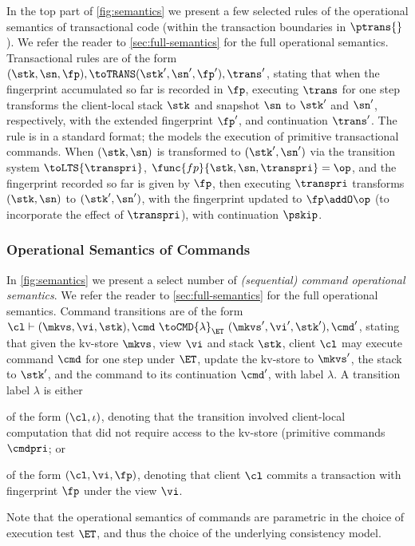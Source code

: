 In the top part of \cref{fig:semantics} we present a few selected rules of the operational semantics of transactional code (within the transaction boundaries in $\ptrans{}$). 
We refer the reader to \cref{sec:full-semantics} for the full operational semantics.
Transactional rules are of the form $(\stk, \sn, \fp), \toTRANS (\stk', \sn', \fp'), \trans'$, 
stating that when the fingerprint accumulated so far is recorded in $\fp$, 
executing $\trans$ for one step transforms the client-local stack $\stk$ 
and snapshot $\sn$ %
to $\stk'$ and $\sn'$, respectively, with the extended fingerprint $\fp'$, and continuation $\trans'$.
The  rule is in a standard format; 
the   models the execution of primitive transactional commands.
When $(\stk, \sn)$ is transformed to $(\stk', \sn')$ via the transition system $\toLTS{\transpri}$,
$\func{fp}{\stk, \sn, \transpri} = \op$, and the fingerprint recorded so far is given by $\fp$, 
then executing $\transpri$ transforms $(\stk, \sn)$ to $(\stk', \sn')$, with the fingerprint updated to $\fp \addO \op$ (to incorporate the effect of $\transpri$), with continuation $\pskip$. 

\subsubsection{Operational Semantics of Commands}
In \cref{fig:semantics} we present a select number of \emph{(sequential) command operational semantics}.
We refer the reader to \cref{sec:full-semantics} for the full operational semantics.
Command transitions are of the form $\cl \vdash (\mkvs, \vi, \stk), \cmd \ \toCMD{\lambda}_{\ET} \ (\mkvs', \vi', \stk') , \cmd'$, 
stating that given the kv-store $\mkvs$, view $\vi$ and stack $\stk$, client $\cl$ may execute command $\cmd$ for one step under $\ET$, update the kv-store to $\mkvs'$, the stack to $\stk'$, and the command to its continuation $\cmd'$, with label $\lambda$.
A transition label $\lambda$ is either
\begin{enumerate*}
	\item of the form $(\cl, \iota)$, denoting that the transition involved 
client-local computation that did not require access to the kv-store (\eg primitive commands $\cmdpri$; or
	\item of the form $(\cl, \vi, \fp)$, denoting that client $\cl$ commits a transaction with fingerprint $\fp$ under the view $\vi$.
\end{enumerate*}
Note that the operational semantics of commands are parametric in the choice of execution test $\ET$, 
and thus the choice of the underlying consistency model.


